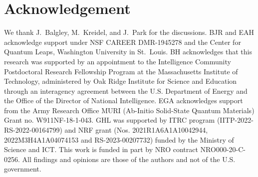 \documentclass[aip, amsmath,amssymb, reprint]{revtex4-1}
\begin{document}
\section{Acknowledgement}
We thank J.~Balgley, M.~Kreidel, and J.~Park for the discussions. BJR and EAH acknowledge support under NSF CAREER DMR-1945278 and the Center for Quantum Leaps, Washington University in St.\ Louis. BH acknowledges that this research was supported by an appointment to the Intelligence Community Postdoctoral Research Fellowship Program at the Massachusetts Institute of Technology, administered by Oak Ridge Institute for Science and Education through an interagency agreement between the U.S. Department of Energy and the Office of the Director of National Intelligence. EGA acknowledges support from the Army Research Office MURI (Ab-Initio Solid-State Quantum Materials) Grant no. W911NF-18-1-043. GHL was supported by ITRC program (IITP-2022-RS-2022-00164799) and NRF grant (Nos. 2021R1A6A1A10042944, 2022M3H4A1A04074153 and RS-2023-00207732) funded by the Ministry of Science and ICT. This work is funded in part by NRO contract NRO000-20-C-0256. All findings and opinions are those of the authors and not of the U.S. government.


\end{document}

